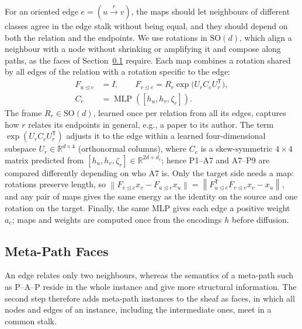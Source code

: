 \documentclass{article}
\newcommand{\R}{\mathbb{R}}
\newcommand{\norm}[1]{\left\lVert #1\right\rVert}
\newcommand{\transpose}{\mathsf{T}}
\newcommand{\inc}{\trianglelefteq}
\begin{document}
For an oriented edge $e=(u\xrightarrow{r}v)$, the maps should let neighbours of different classes agree in the edge stalk without being equal, and they should depend on both the relation and the endpoints. We use rotations in $\mathrm{SO}(d)$, which align a neighbour with a node without shrinking or amplifying it and compose along paths, as the faces of Section~\ref{sec:faces} require. Each map combines a rotation shared by all edges of the relation with a rotation specific to the edge:
\begin{equation}
\begin{aligned}
  F_{u\inc e}&=I,\qquad F_{v\inc e}=R_r\exp\bigl(U_rC_eU_r^{\transpose}\bigr),\\
  C_e&=\operatorname{MLP}([h_u,h_v,\zeta_r]).
\end{aligned}
  \label{eq:maps}
\end{equation}
The frame $R_r\in\mathrm{SO}(d)$, learned once per relation from all its edges, captures how $r$ relates its endpoints in general, e.g., a paper to its author. The term $\exp(U_rC_eU_r^{\transpose})$ adjusts it to the edge within a learned four-dimensional subspace $U_r\in\R^{d\times4}$ (orthonormal columns), where $C_e$ is a skew-symmetric $4\times4$ matrix predicted from $[h_u,h_v,\zeta_r]\in\R^{2d+d_r}$; hence P1--A7 and A7--P9 are compared differently depending on who A7 is. Only the target side needs a map: rotations preserve length, so $\norm{F_{v\inc e}x_v-F_{u\inc e}x_u}=\norm{F_{u\inc e}^{\transpose}F_{v\inc e}x_v-x_u}$, and any pair of maps gives the same energy as the identity on the source and one rotation on the target. Finally, the same MLP gives each edge a positive weight $a_e$; maps and weights are computed once from the encodings $h$ before diffusion.

\subsection{Meta-Path Faces}
\label{sec:faces}
An edge relates only two neighbours, whereas the semantics of a meta-path such as P--A--P reside in the whole instance and give more structural information. The second step therefore adds meta-path instances to the sheaf as faces, in which all nodes and edges of an instance, including the intermediate ones, meet in a common stalk.
\end{document}
